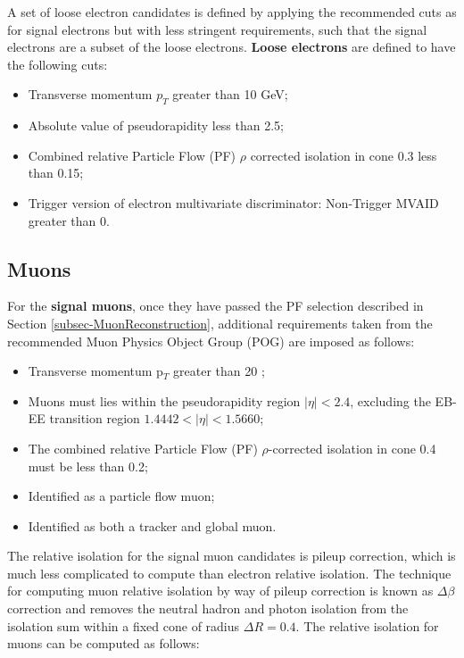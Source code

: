 A set of loose electron candidates is defined by applying the recommended cuts as for signal electrons but with less stringent requirements, such that the signal electrons are a subset of the loose electrons. \textbf{Loose electrons} are defined to have the following cuts:

\begin{itemize}
	\item Transverse momentum $p_T$ greater than 10 GeV;
	\item Absolute value of pseudorapidity less than 2.5;
	\item Combined relative Particle Flow (PF) $\rho$ corrected isolation in cone 0.3 less than 0.15;
	\item Trigger version of electron multivariate discriminator: Non-Trigger MVAID greater than 0.
\end{itemize}

\subsection{Muons}

For the \textbf{signal muons}, once they have passed the PF selection described in Section \ref{subsec-MuonReconstruction}, additional requirements taken from the recommended Muon Physics Object Group (POG) \cite{TOPMUO1} are imposed as follows:

\begin{itemize}
	\item Transverse momentum p$_T$ greater than 20 \GeV;
	\item Muons must lies within the pseudorapidity region $|\eta| < 2.4$, excluding the EB-EE transition region $1.4442 < |\eta| < 1.5660$;
	\item The combined relative Particle Flow (PF) $\rho$-corrected isolation in cone 0.4 must be less than 0.2;
	\item Identified as a particle flow muon;
	\item Identified as both a tracker and global muon.
\end{itemize}

The relative isolation for the signal muon candidates is pileup correction, which is much less complicated to compute than electron relative isolation. The technique for computing muon relative isolation by way of pileup correction is known as $\Delta \beta$ correction and removes the neutral hadron and photon isolation from the isolation sum within a fixed cone of radius $\Delta R = 0.4$. The relative isolation for muons can be computed as follows:


